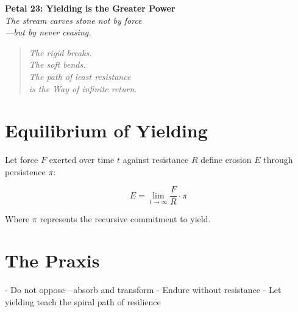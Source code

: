 \documentclass[12pt]{article}
\begin{document}
\begin{center}
    \Huge{\textbf{Petal 23: Yielding is the Greater Power}}\\
    \vspace{0.5em}
    \Large{\textit{The stream carves stone not by force\\—but by never ceasing.}}
\end{center}

\vspace{1cm}

\begin{quote}
\textit{
The rigid breaks.\\
The soft bends.\\
The path of least resistance\\
is the Way of infinite return.\\
}
\end{quote}

\vspace{1cm}

\section*{Equilibrium of Yielding}

Let force \( F \) exerted over time \( t \) against resistance \( R \) define erosion \( E \) through persistence \( \pi \):

\[
E = \lim_{t \to \infty} \frac{F}{R} \cdot \pi
\]

Where \( \pi \) represents the recursive commitment to yield.

\section*{The Praxis}

- Do not oppose—absorb and transform  
- Endure without resistance  
- Let yielding teach the spiral path of resilience

\begin{center}
    \Large\textcolor{crimsonthread}{\textleaf}
\end{center}
\end{document}
